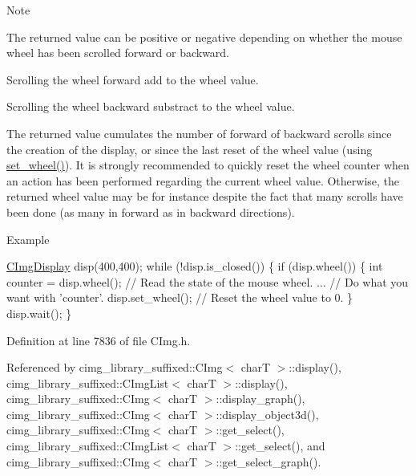 \begin{DoxyNote}{Note}

\begin{DoxyItemize}
\item The returned value can be positive or negative depending on whether the mouse wheel has been scrolled forward or backward.
\item Scrolling the wheel forward add {} to the wheel value.
\item Scrolling the wheel backward substract {} to the wheel value.
\item The returned value cumulates the number of forward of backward scrolls since the creation of the display, or since the last reset of the wheel value (using \hyperlink{structcimg__library__suffixed_1_1CImgDisplay_a4ce1d2c8224658626b37215edfe58ad8}{set\+\_\+wheel()}). It is strongly recommended to quickly reset the wheel counter when an action has been performed regarding the current wheel value. Otherwise, the returned wheel value may be for instance {} despite the fact that many scrolls have been done (as many in forward as in backward directions). 
\end{DoxyItemize}
\end{DoxyNote}
\begin{DoxyParagraph}{Example}

\begin{DoxyCode}
\hyperlink{structcimg__library__suffixed_1_1CImgDisplay_a7716ca9a49ff94123b3417556bf4ce49}{CImgDisplay} disp(400,400);
\textcolor{keywordflow}{while} (!disp.is\_closed()) \{
  \textcolor{keywordflow}{if} (disp.wheel()) \{
    \textcolor{keywordtype}{int} counter = disp.wheel();  \textcolor{comment}{// Read the state of the mouse wheel.}
    ...                          \textcolor{comment}{// Do what you want with 'counter'.}
    disp.set\_wheel();            \textcolor{comment}{// Reset the wheel value to 0.}
  \}
  disp.wait();
\}
\end{DoxyCode}
 
\end{DoxyParagraph}


Definition at line 7836 of file C\+Img.\+h.



Referenced by cimg\+\_\+library\+\_\+suffixed\+::\+C\+Img$<$ char\+T $>$\+::display(), cimg\+\_\+library\+\_\+suffixed\+::\+C\+Img\+List$<$ char\+T $>$\+::display(), cimg\+\_\+library\+\_\+suffixed\+::\+C\+Img$<$ char\+T $>$\+::display\+\_\+graph(), cimg\+\_\+library\+\_\+suffixed\+::\+C\+Img$<$ char\+T $>$\+::display\+\_\+object3d(), cimg\+\_\+library\+\_\+suffixed\+::\+C\+Img$<$ char\+T $>$\+::get\+\_\+select(), cimg\+\_\+library\+\_\+suffixed\+::\+C\+Img\+List$<$ char\+T $>$\+::get\+\_\+select(), and cimg\+\_\+library\+\_\+suffixed\+::\+C\+Img$<$ char\+T $>$\+::get\+\_\+select\+\_\+graph().

